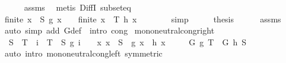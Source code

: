 \begin{isabellebody}
\ \ \ \ \isamarkupfalse%
\ assms\ \isamarkupfalse%
\ {\isacharparenleft}{\kern0pt}metis\ DiffI\ subset{\isacharunderscore}{\kern0pt}eq{\isacharparenright}{\kern0pt}\ \isanewline
\ \ \isamarkupfalse%
\ \isamarkupfalse%
\ {\isachardoublequoteopen}finite\ {\isacharbraceleft}{\kern0pt}x\ {\isasymin}\ S{\isachardot}{\kern0pt}\ g\ x\ {\isasymnoteq}\ \ {\isacharequal}{\kern0pt}\ finite\ {\isacharbraceleft}{\kern0pt}x\ {\isasymin}\ T{\isachardot}{\kern0pt}\ h\ x\ {\isasymnoteq}\ \isanewline
\ \ \ \ \isamarkupfalse%
\ simp\isanewline
\ \ \isamarkupfalse%
\ \isamarkupfalse%
\ {\isacharquery}{\kern0pt}thesis\isanewline
\ \ \ \ \isamarkupfalse%
\ assms\ \isamarkupfalse%
\ {\isacharparenleft}{\kern0pt}auto\ simp\ add{\isacharcolon}{\kern0pt}\ G{\isacharunderscore}{\kern0pt}def\ {\isacharasterisk}{\kern0pt}\ intro{\isacharcolon}{\kern0pt}\ cong{\isacharparenright}{\kern0pt}\isanewline
{}\isamarkupfalse%
%
\endisatagproof
{\isafoldproof}%
%
\isadelimproof
\isanewline
%
\endisadelimproof
\isanewline
{}\isamarkupfalse%
\ mono{\isacharunderscore}{\kern0pt}neutral{\isacharunderscore}{\kern0pt}cong{\isacharunderscore}{\kern0pt}right{\isacharprime}{\kern0pt}{\isacharcolon}{\kern0pt}\isanewline
\ \ {\isachardoublequoteopen}S\ {\isasymsubseteq}\ T\ {\isasymLongrightarrow}\ {\isasymforall}i\ {\isasymin}\ T\ {\isacharminus}{\kern0pt}\ S{\isachardot}{\kern0pt}\ g\ i\ {\isacharequal}{\kern0pt}\ \ {\isasymLongrightarrow}\ {\isacharparenleft}{\kern0pt}{\isasymAnd}x{\isachardot}{\kern0pt}\ x\ {\isasymin}\ S\ {\isasymLongrightarrow}\ g\ x\ {\isacharequal}{\kern0pt}\ h\ x{\isacharparenright}{\kern0pt}\ {\isasymLongrightarrow}\isanewline
\ \ \ \ G\ g\ T\ {\isacharequal}{\kern0pt}\ G\ h\ S{\isachardoublequoteclose}\isanewline
%
\isadelimproof
\ \ %
\endisadelimproof
%
\isatagproof
{}\isamarkupfalse%
\ {\isacharparenleft}{\kern0pt}auto\ intro{\isacharbang}{\kern0pt}{\isacharcolon}{\kern0pt}\ mono{\isacharunderscore}{\kern0pt}neutral{\isacharunderscore}{\kern0pt}cong{\isacharunderscore}{\kern0pt}left{\isacharprime}{\kern0pt}\ {\isacharbrackleft}{\kern0pt}symmetric{\isacharbrackright}{\kern0pt}{\isacharparenright}{\kern0pt}%
\endisatagproof
{\isafoldproof}%
%
\isadelimproof
\isanewline
%
\endisadelimproof
\isanewline
{}\isamarkupfalse%

\end{isabellebody}
